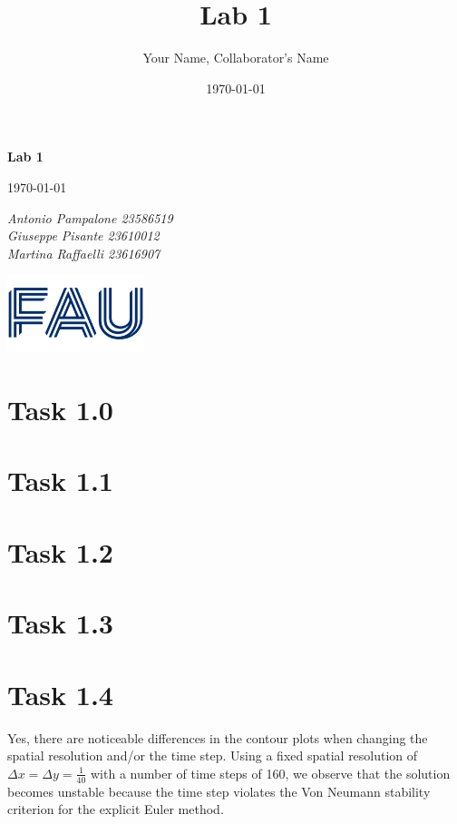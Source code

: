 \documentclass{article}
\title{Lab 1}
\author{Your Name, Collaborator's Name}
\date{\today}
\begin{document}
\begin{titlepage}
    \centering
    \vspace*{1in}
    
    {\Huge\bfseries Lab 1\par}
    \vspace{1.5cm}
    {\Large \today\par}
    \vspace{1.5cm}
    {\Large\itshape Antonio Pampalone 23586519 \\ Giuseppe Pisante 23610012\\ Martina Raffaelli 23616907 \par}
    
    \vfill
    \includegraphics[width=0.3\textwidth]{FAU-Logo.png}\par\vspace{1cm} %
   
\end{titlepage}

\newpage
\small

\section{Task 1.0}

\section{Task 1.1}

\section{Task 1.2}

\section{Task 1.3}

\section{Task 1.4}

Yes, there are noticeable differences in the contour plots when changing the spatial resolution and/or the time step.
Using a fixed spatial resolution of \( \Delta x = \Delta y = \frac{1}{40} \) with a number of time steps of 160, we observe that 
the solution becomes unstable because the time step violates the Von Neumann stability criterion for the explicit Euler method.
\end{document}
